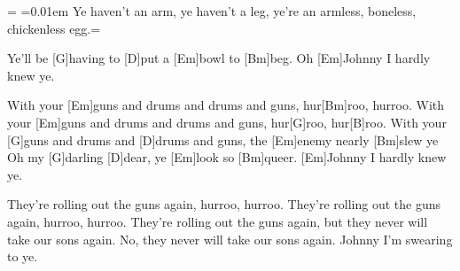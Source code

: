 \newdimen\origiwstr%
\origiwstr=\font%
\font=0.01em Ye haven't an arm, ye haven't a leg, ye're an armless, boneless, chickenless egg.\font=\origiwstr

\begin{guitar}
	Ye'll be [G]having to [D]put a [Em]bowl to [Bm]beg. Oh [Em]Johnny I hardly knew ye.
	
	\begin{highlightbar}
		With your [Em]guns and drums and drums and guns, hur[Bm]roo, hurroo.
		With your [Em]guns and drums and drums and guns, hur[G]roo, hur[B]roo.
		With your [G]guns and drums and [D]drums and guns, the [Em]enemy nearly [Bm]slew ye
		Oh my [G]darling [D]dear, ye [Em]look so [Bm]queer. [Em]Johnny I hardly knew ye.
	\end{highlightbar}
	
	They're rolling out the guns again, hurroo, hurroo.
	They're rolling out the guns again, hurroo, hurroo.
	They're rolling out the guns again, but they never will take our sons again.
	No, they never will take our sons again. Johnny I'm swearing to ye.
\end{guitar}